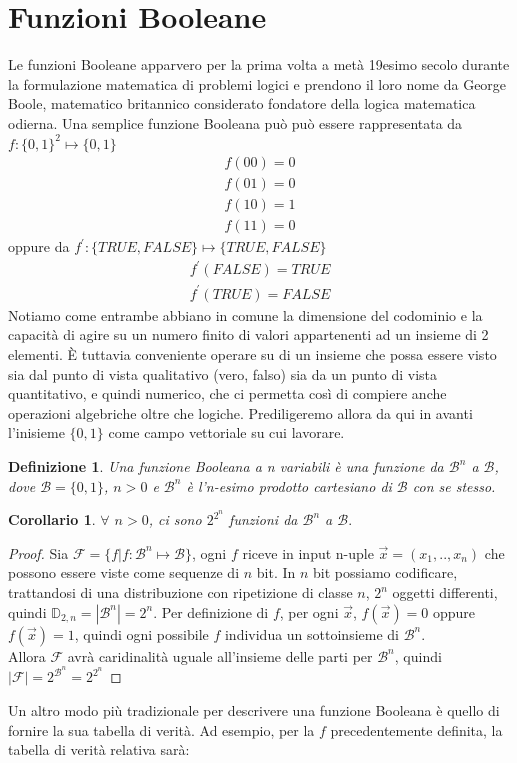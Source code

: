 \documentclass[12pt,a4paper,openright]{report}
\newtheorem{mydef}{Definizione}[chapter]
\newtheorem*{mycor}{Corollario}
\begin{document}
\section{Funzioni Booleane}
Le funzioni Booleane apparvero per la prima volta a metà 19esimo secolo durante la formulazione matematica di problemi logici e prendono
il loro nome da George Boole, matematico britannico considerato fondatore della logica matematica odierna\cite{ref2}.\newpage
Una semplice funzione Booleana può può essere rappresentata da \\$f:\{0,1\}^2 \mapsto \{0,1\}$
\begin{align*}  
    f(00) = 0 \\
    f(01) = 0 \\
    f(10) = 1 \\
    f(11) = 0
\end{align*}
oppure da $f^\prime:\{TRUE,FALSE\}\mapsto{\{TRUE,FALSE\}}$
\begin{align*}
    f^\prime(FALSE) = TRUE \\
    f^\prime(TRUE) = FALSE 
\end{align*}
Notiamo come entrambe abbiano in comune la dimensione del codominio e la capacità di agire su un numero finito di valori appartenenti ad un insieme di 2 elementi.
È tuttavia conveniente operare su di un insieme che possa essere visto sia dal punto di vista qualitativo (vero, falso)
sia da un punto di vista quantitativo, e quindi numerico, che ci permetta così di compiere anche operazioni algebriche oltre che logiche. Prediligeremo allora da qui in avanti l'inisieme
$\{0,1\}$ come campo vettoriale su cui lavorare.
\par
\begin{mydef}
    Una \textnormal{funzione Booleana a \textit{n} variabili} è una funzione da $\mathcal{B}^n$ a $\mathcal{B}$,
    dove $\mathcal{B} = \{0,1\}$, $n > 0$ e $\mathcal{B}^n$ è l'n-esimo prodotto cartesiano di $\mathcal{B}$ con se stesso.\cite{ref3}
\end{mydef}
\begin{mycor}
    $\forall$ $n > 0$, ci sono $2^{2^{n}}$ funzioni da $\mathcal{B}^n$ a $\mathcal{B}.$
\end{mycor}
\begin{proof}
    Sia $\mathcal{F}=\{f|f:\mathcal{B}^n\mapsto{\mathcal{B}}\}$,
    ogni $f$ riceve in input n-uple $\vec{x}=(x_1,..,x_n)$ che possono essere viste come sequenze di $n$ bit.
    In $n$ bit possiamo codificare, trattandosi di una distribuzione con ripetizione di classe $n$, $2^n$ oggetti differenti, quindi $\mathbb{D}_{2,n}=\left\vert{\mathcal{B}^n}\right\vert = 2^n$.
    Per definizione di $f$, per ogni $\vec{x}$, $f(\vec{x}) = 0$  oppure  $f(\vec{x}) = 1$, quindi ogni possibile $f$ individua un sottoinsieme di $\mathcal{B}^n$.\\
    Allora $\mathcal{F}$ avrà caridinalità uguale all'insieme delle parti per $\mathcal{B}^n$, quindi  $\left\vert{\mathcal{F}}\right\vert = 2^{\mathcal{B}^n}=2^{2^{n}}$

\end{proof}
Un altro modo più tradizionale per descrivere una funzione Booleana è quello di fornire la sua tabella di verità.
Ad esempio, per la $f$ precedentemente definita, la tabella di verità relativa sarà:
\end{document}
